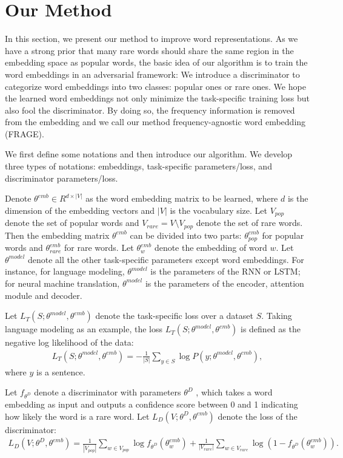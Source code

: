 \documentclass{article}
\begin{document}
\section{Our Method}
In this section, we present our method to improve word representations. As we have a strong prior that many rare words should share the same region in the embedding space as popular words, the basic idea of our algorithm is to train the word embeddings in an adversarial framework: We introduce a discriminator to categorize word embeddings into two classes: popular ones or rare ones. We hope the learned word embeddings not only minimize the task-specific training loss but also fool the discriminator. By doing so, the frequency information is removed from the embedding and we call our method frequency-agnostic word embedding (FRAGE).

We first define some notations and then introduce our algorithm. We develop three types of notations: embeddings, task-specific parameters/loss, and discriminator parameters/loss.

Denote $\theta^{emb}\in R^{ d\times |V|}$ as the word embedding matrix to be learned, where $d$ is the dimension of the embedding vectors and $|V|$ is the vocabulary size. Let $V_{pop}$ denote the set of popular words and $V_{rare}=V\setminus V_{pop}$ denote the set of rare words. Then the embedding matrix $\theta^{emb}$ can be divided into two parts: $\theta^{emb}_{pop}$ for popular words and $\theta^{emb}_{rare}$ for rare words. Let $\theta^{emb}_w$ denote the embedding of word $w$. Let $\theta^{model}$ denote all the other task-specific parameters except word embeddings. For instance, for language modeling, $\theta^{model}$ is the parameters of the RNN or LSTM; for neural machine translation, $\theta^{model}$ is the parameters of the encoder, attention module and decoder.

Let $L_T(S;\theta^{model},\theta^{emb})$ denote the task-specific loss over a dataset $S$. Taking language modeling as an example, the loss $L_T(S;\theta^{model},\theta^{emb})$ is defined as the negative log likelihood of the data:
\begin{eqnarray}
L_T(S;\theta^{model},\theta^{emb})=-\frac{1}{|S|}\sum_{y\in S}\log P(y;\theta^{model},\theta^{emb}),
\end{eqnarray}
where $y$ is a sentence.

Let $f_{\theta^{D}}$ denote a discriminator with parameters $\theta^{D}$ , which takes a word embedding as input and outputs a confidence score between 0 and 1 indicating how likely the word is a rare word. Let $L_D(V;\theta^{D},\theta^{emb})$ denote the loss of the discriminator:
\begin{eqnarray}
L_D(V;\theta^{D},\theta^{emb})=\frac{1}{|V_{pop}|}\sum_{w\in V_{pop}}\log f_{\theta^{D}}(\theta^{emb}_w) + \frac{1}{|V_{rare}|}\sum_{w\in V_{rare}}\log(1-f_{\theta^{D}}(\theta^{emb}_w)).
\end{eqnarray}
\end{document}

